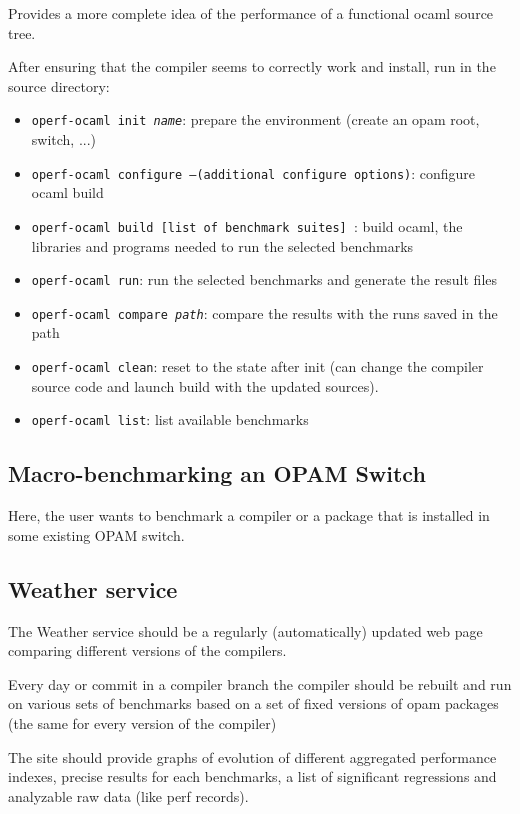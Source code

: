 \documentclass[11pt,a4paper]{article}
\begin{document}
Provides a more complete idea of the performance of a functional
ocaml source tree.

After ensuring that the compiler seems to correctly work and install,
run in the source directory:

\begin{itemize}
\item {\tt operf-ocaml init {\em name}}: prepare the environment (create an opam root, switch, ...)
\item {\tt operf-ocaml configure  --(additional configure options)}: configure ocaml build
\item {\tt operf-ocaml build [list of benchmark suites] }: build ocaml, the
  libraries and programs needed to run the selected benchmarks
\item {\tt operf-ocaml run}: run the selected benchmarks and generate the result files
\item {\tt operf-ocaml compare {\em path}}: compare the results with the runs saved in the path
\item {\tt operf-ocaml clean}: reset to the state after init (can change the compiler source code and launch build with the updated sources).
\item {\tt operf-ocaml list}: list available benchmarks
\end{itemize}

\subsection{Macro-benchmarking an OPAM Switch}

Here, the user wants to benchmark a compiler or a package that is
installed in some existing OPAM switch.

\subsection{Weather service}

The Weather service should be a regularly (automatically) updated web
page comparing different versions of the compilers.

Every day or commit in a compiler branch the compiler should be
rebuilt and run on various sets of benchmarks based on a set of fixed
versions of opam packages (the same for every version of the compiler)

The site should provide graphs of evolution of different aggregated
performance indexes, precise results for each benchmarks, a list of
significant regressions and analyzable raw data (like perf records).
\end{document}
